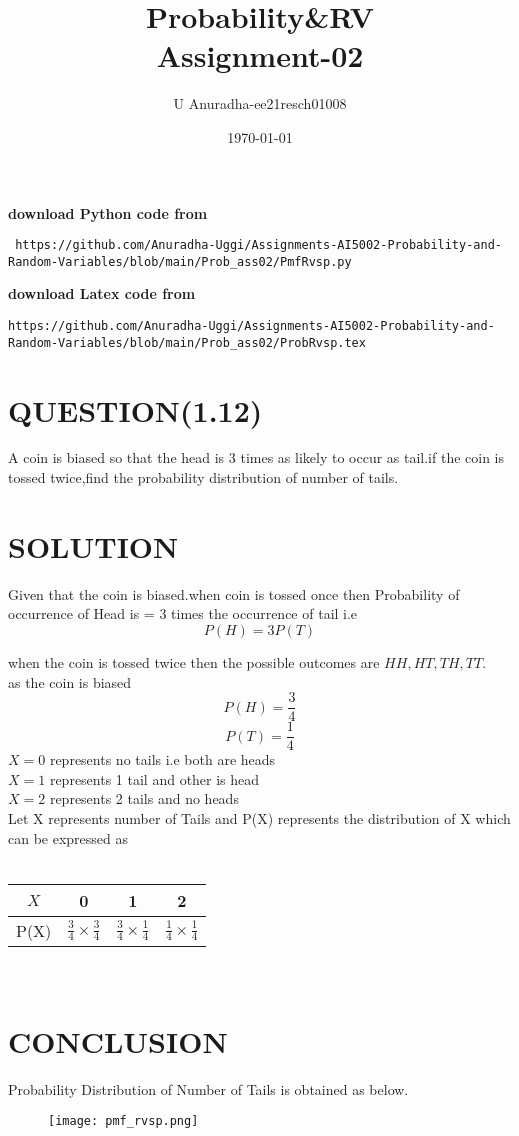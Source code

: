 \documentclass[journal,12pt,twocolumn]{IEEEtran}
\title{Probability\&RV \\ Assignment-02}
\author{U Anuradha-ee21resch01008}
\date{\today}
\begin{document}
\maketitle
\newpage
\bigskip
\renewcommand{\thefigure}{\theenumi}
\renewcommand{\thetable}{\theenumi}
\textbf{download Python code from}
\begin{lstlisting}
 https://github.com/Anuradha-Uggi/Assignments-AI5002-Probability-and-Random-Variables/blob/main/Prob_ass02/PmfRvsp.py
\end{lstlisting}
\textbf{download Latex code from}
\begin{lstlisting}
https://github.com/Anuradha-Uggi/Assignments-AI5002-Probability-and-Random-Variables/blob/main/Prob_ass02/ProbRvsp.tex
\end{lstlisting}
\section{QUESTION(1.12)}
A coin is biased so that the head is 3 times as likely to occur as tail.if the coin is tossed twice,find the probability distribution of number of tails. \\
\section{SOLUTION}
Given that the coin is biased.when coin is tossed once then
Probability of occurrence of Head is = 3 times the occurrence of tail i.e
\begin{equation}
    P(H)=3 P(T)
\end{equation}

when the coin is tossed twice then the possible outcomes are   $HH,HT,TH,TT$.\\
as the coin is biased 
\begin{equation*}
    P(H)=\frac{3}{4} 
\end{equation*}
\begin{equation*}
    P(T)=\frac{1}{4}
\end{equation*}
$X=0$ represents no tails i.e both are heads\\
$X=1$ represents 1 tail and other is head\\
$X=2$ represents 2 tails and no heads\\

Let X represents number of Tails and P(X) represents the distribution of  X which can be expressed as\\ \\
\begin{tabular}{|c|c|c|c|}
\hline
   $X$  & 0 & 1 & 2 \\
\hline
  P(X) & $\frac{3}{4}\times \frac{3}{4}$ &$\frac{3}{4}\times \frac{1}{4}$ & $ \frac{1}{4}\times \frac{1}{4}$ \\
  \hline
\end{tabular}\\
\newline
\section{CONCLUSION}
Probability Distribution of Number of Tails is obtained as below.\\
\begin{figure}[ht]
    \texttt{[image: pmf\_rvsp.png]}
    
\end{figure}
\end{document}
